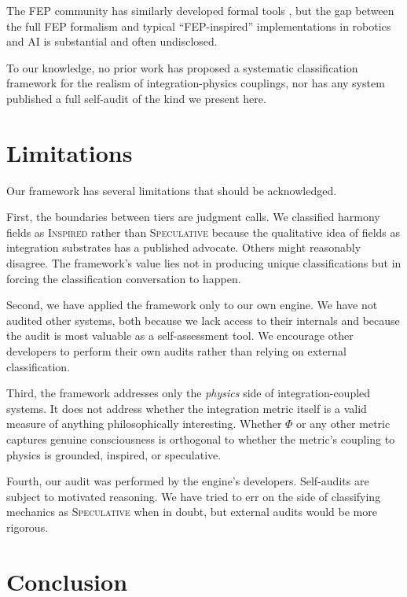 \documentclass[12pt,a4paper]{article}
\begin{document}
The FEP community has similarly developed formal tools
\citep{friston2010,parr2022}, but the gap between the full
FEP formalism and typical ``FEP-inspired'' implementations
in robotics and AI is substantial and often undisclosed.

To our knowledge, no prior work has proposed a systematic
classification framework for the realism of integration-physics
couplings, nor has any system published a full self-audit of
the kind we present here.


\section{Limitations}
\label{sec:limitations}

Our framework has several limitations that should be
acknowledged.

First, the boundaries between tiers are judgment calls.  We
classified harmony fields as \textsc{Inspired} rather than
\textsc{Speculative} because the qualitative idea of fields
as integration substrates has a published advocate.  Others
might reasonably disagree.  The framework's value lies not in
producing unique classifications but in forcing the
classification conversation to happen.

Second, we have applied the framework only to our own engine.
We have not audited other systems, both because we lack access
to their internals and because the audit is most valuable as a
self-assessment tool.  We encourage other developers to
perform their own audits rather than relying on external
classification.

Third, the framework addresses only the \emph{physics} side of
integration-coupled systems.  It does not address whether the
integration metric itself is a valid measure of anything
philosophically interesting.  Whether $\Phi$ or any other
metric captures genuine consciousness is orthogonal to whether
the metric's coupling to physics is grounded, inspired, or
speculative.

Fourth, our audit was performed by the engine's developers.
Self-audits are subject to motivated reasoning.  We have tried
to err on the side of classifying mechanics as
\textsc{Speculative} when in doubt, but external audits would
be more rigorous.


\section{Conclusion}
\label{sec:conclusion}
\end{document}
